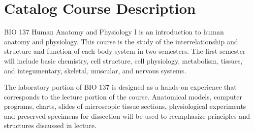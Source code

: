 \documentclass[11pt]{article}
\begin{document}
\vspace{0.5em}

\section*{Catalog Course Description}

BIO 137 Human Anatomy and Physiology I is an introduction to human anatomy and physiology. This course is the study of the interrelationship and structure and function of each body system in two semesters. The first semester will include basic chemistry, cell structure, cell physiology, metabolism, tissues, and integumentary, skeletal, muscular, and nervous systems.

The laboratory portion of BIO 137 is designed as a hands-on experience that corresponds to the lecture portion of the course. Anatomical models, computer programs, charts, slides of microscopic tissue sections, physiological experiments and preserved specimens for dissection will be used to reemphasize principles and structures discussed in lecture.


\newpage



\newpage



\newpage 



\newpage


\end{document}
